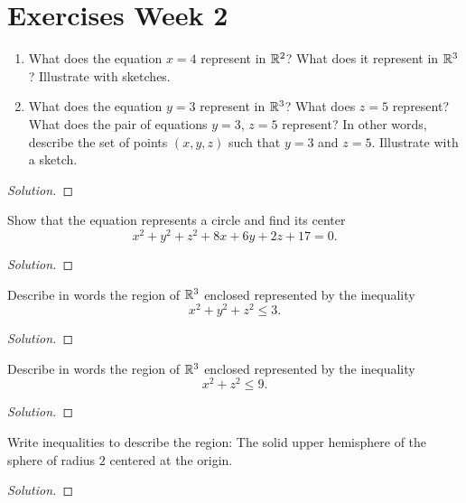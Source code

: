 \chapter{Exercises Week 2}
\begin{exercise}[Stewart {\S}12.2, {\#}6]
\begin{enumerate}[label=(\alph*)]
 \item What does the equation $x=4$ represent in $\mathbb{R}^2$? What does it
   represent in $\mathbb{R}^3$? Illustrate with sketches.
\item What does the equation $y=3$ represent in $\mathbb{R}^3$? What does $z=5$
  represent? What does the pair of equations $y=3$, $z=5$ represent? In
  other words, describe the set of points $(x,y,z)$ such that $y=3$ and
  $z=5$.  Illustrate with a sketch.
\end{enumerate}
\end{exercise}
\begin{proof}[Solution]
\end{proof}

\begin{exercise}[Stewart {\S}12.2, {\#}16]
Show that the equation represents a circle and find its center
\[
x^2+y^2+z^2+8x+6y+2z+17=0.
\]
\end{exercise}
\begin{proof}[Solution]
\end{proof}

\begin{exercise}[Stewart {\S}12.2, {\#}31]
Describe in words the region of $\mathbb{R}^3$ enclosed represented by the
inequality
\[
x^2+y^2+z^2\leq 3.
\]
\end{exercise}
\begin{proof}[Solution]
\end{proof}

\begin{exercise}[Stewart {\S}12.2, {\#}33]
Describe in words the region of $\mathbb{R}^3$ enclosed represented by the
inequality
\[
x^2+z^2\leq 9.
\]
\end{exercise}
\begin{proof}[Solution]
\end{proof}

\begin{exercise}[Stewart {\S}12.2, {\#}38]
Write inequalities to describe the region: The solid upper hemisphere of
the sphere of radius $2$ centered at the origin.
\end{exercise}
\begin{proof}[Solution]
\end{proof}

